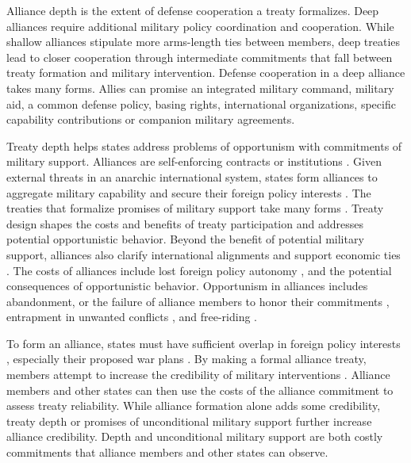 \documentclass[12pt]{article}
\begin{document}
Alliance depth is the extent of defense cooperation a treaty formalizes. 
Deep alliances require additional military policy coordination and cooperation. 
While shallow alliances stipulate more arms-length ties between members, deep treaties lead to closer cooperation through intermediate commitments that fall between treaty formation and military intervention. 
Defense cooperation in a deep alliance takes many forms. 
Allies can promise an integrated military command, military aid, a common defense policy, basing rights, international organizations, specific capability contributions or companion military agreements. 


Treaty depth helps states address problems of opportunism with commitments of military support.
Alliances are self-enforcing contracts or institutions \citep{Leedsetal2002, Morrow2000}.
Given external threats in an anarchic international system, states form alliances to aggregate military capability and secure their foreign policy interests \citep{Altfield1984, Smith1995, Snyder1997, FordhamPoast2014}. 
The treaties that formalize promises of military support take many forms \citep{Leedsetal2000, Leedsetal2002, Benson2012, BensonClinton2016}. 
Treaty design shapes the costs and benefits of treaty participation and addresses potential opportunistic behavior. 
Beyond the benefit of potential military support, alliances also clarify international alignments \citep{Snyder1990} and support economic ties \citep{Gowa1995, Li2003, Long2003, Fordham2010, WolfordKim2017}. 
The costs of alliances include lost foreign policy autonomy \citep{Altfield1984, Morrow2000, Johnson2015}, and the potential consequences of opportunistic behavior. 
Opportunism in alliances includes abandonment, or the failure of alliance members to honor their commitments \citep{Leeds2003a, BerkemeierFuhrmann2018}, entrapment in unwanted conflicts \citep{Snyder1984}, and free-riding \citep{Morrow2000}.   


To form an alliance, states must have sufficient overlap in foreign policy interests \citep{Morrow1991, Smith1995, FordhamPoast2014}, especially their proposed war plans \citep{Poast2019a}. 
By making a formal alliance treaty, members attempt to increase the credibility of military interventions \citep{Morrow2000}. 
Alliance members and other states can then use the costs of the alliance commitment to assess treaty reliability. 
While alliance formation alone adds some credibility, treaty depth or promises of unconditional military support further increase alliance credibility. 
Depth and unconditional military support are both costly commitments that alliance members and other states can observe. 
\end{document}

